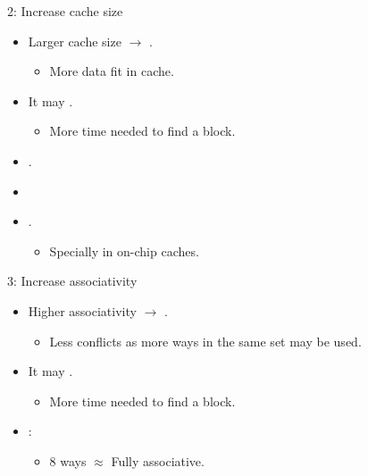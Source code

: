 \begin{frame}[t]{2: Increase cache size}
\begin{itemize}
  \item Larger cache size $\rightarrow$ .
    \begin{itemize}
      \item More data fit in cache.
    \end{itemize}

  \item It may .
    \begin{itemize}
      \item More time needed to find a block.
    \end{itemize}

  \item {}.

  \item {}

  \item {}.
    \begin{itemize}
      \item Specially in on-chip caches.
    \end{itemize}
\end{itemize}
\end{frame}

\begin{frame}[t]{3: Increase associativity}

\begin{itemize}
  \item Higher associativity $\rightarrow$ .
    \begin{itemize}
      \item Less conflicts as more ways in the same set may be used.
    \end{itemize}

  \item It may .
    \begin{itemize}
      \item More time needed to find a block.
    \end{itemize}

  \item {}:
    \begin{itemize}
      \item 8 ways $\approx$ Fully associative.
    \end{itemize}
\end{itemize}

\end{frame}

